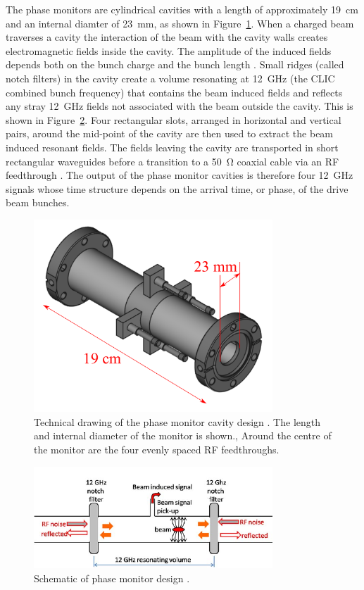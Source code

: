 The phase monitors are cylindrical cavities with a length of approximately 19~cm and an internal diamter of 23~mm, as shown in Figure~\ref{f:phMonTechDraw}. When a charged beam traverses a cavity the interaction of the beam with the cavity walls creates electromagnetic fields inside the cavity. The amplitude of the induced fields depends both on the bunch charge and the bunch length \cite{alexPFFWP}. Small ridges (called notch filters) in the cavity create a volume resonating at 12~GHz (the CLIC combined bunch frequency) that contains the beam induced fields and reflects any stray 12~GHz fields not associated with the beam outside the cavity. This is shown in Figure~\ref{f:notchFilters}. Four rectangular slots, arranged in horizontal and vertical pairs, around the mid-point of the cavity are then used to extract the beam induced resonant fields. The fields leaving the cavity are transported in short rectangular waveguides before a transition to a 50~\(\mathrm{\Omega}\) coaxial cable via an RF feedthrough \cite{phMonIPAC10}. The output of the phase monitor cavities is therefore four 12~GHz signals whose time structure depends on the arrival time, or phase, of the drive beam bunches.

\begin{figure}
  \centering
  \includegraphics[width=0.8\textwidth]{Figures/phaseMons/phMonTechDraw}
  \caption{Technical drawing of the phase monitor cavity design \cite{phMonTechDraw}. The length and internal diameter of the monitor is shown., Around the centre of the monitor are the four evenly spaced RF feedthroughs.}
  \label{f:phMonTechDraw}
\end{figure}

\begin{figure}
  \centering
  \includegraphics[width=0.8\textwidth]{Figures/phaseMons/notchFilters}
  \caption{Schematic of phase monitor design \cite{phMonEuCard}.}
  \label{f:notchFilters}
\end{figure}


